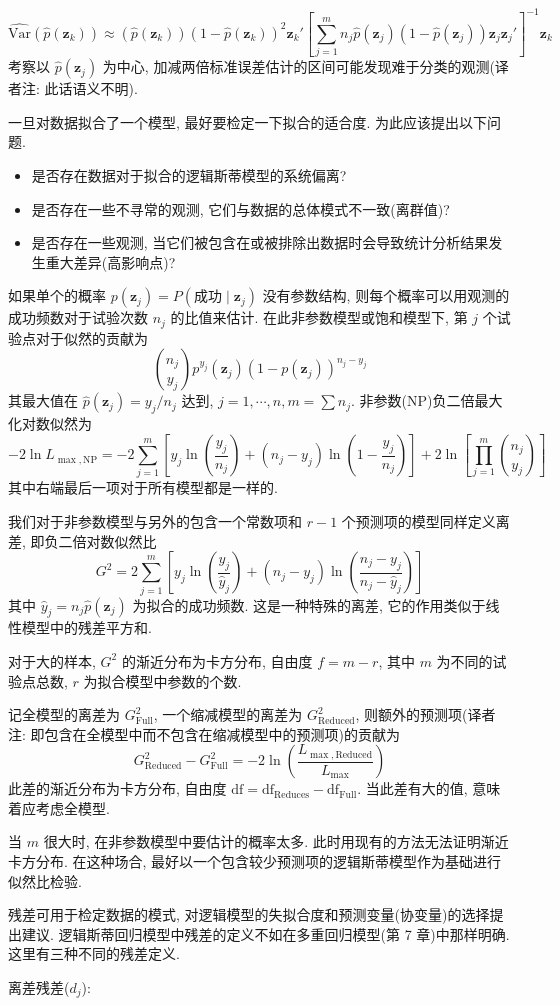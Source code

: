 
\[
\widehat{\mathrm{Var}}(\hat{p}(\mathbf{z}_k))\approx(\hat{p}(\mathbf{z}_k))(1-\hat{p}(\mathbf{z}_k))^2\mathbf{z}_k'\left[\sum_{j=1}^{m}n_j\hat{p}(\mathbf{z}_j)(1-\hat{p}(\mathbf{z}_j))\mathbf{z}_j\mathbf{z}_j'\right]^{-1}\mathbf{z}_k
\]
考察以 $\hat{p}(\mathbf{z}_j)$ 为中心, 加减两倍标准误差估计的区间可能发现难于分类的观测(译者注: 此话语义不明).

\quad{}\quad 一旦对数据拟合了一个模型, 最好要检定一下拟合的适合度. 为此应该提出以下问题.
\begin{itemize}
\item 是否存在数据对于拟合的逻辑斯蒂模型的系统偏离?
\item 是否存在一些不寻常的观测, 它们与数据的总体模式不一致(离群值)?
\item 是否存在一些观测, 当它们被包含在或被排除出数据时会导致统计分析结果发生重大差异(高影响点)?
\end{itemize}
如果单个的概率 $p(\mathbf{z}_j)=P(\text{成功}\mid \mathbf{z}_j)$ 没有参数结构, 则每个概率可以用观测的成功频数对于试验次数 $n_j$ 的比值来估计. 在此非参数模型或饱和模型下, 第 $j$ 个试验点对于似然的贡献为
\[
\binom{n_j}{y_j}p^{y_j}(\mathbf{z}_j)(1-p(\mathbf{z}_j))^{n_j-y_j}
\]
其最大值在 $\hat{p}(\mathbf{z}_j)=y_j/n_j$ 达到, $j=1,\cdots,n, m=\sum n_j$. 非参数(NP)负二倍最大化对数似然为
\label{eq:11-80}
\begin{equation}
-2\ln L_{\max,\mathrm{NP}}=-2\sum_{j=1}^{m}\left[y_j\ln\left(\frac{y_j}{n_j}\right)+(n_j-y_j)\ln\left(1-\frac{y_j}{n_j}\right)\right]+2\ln\left[\prod_{j=1}^{m}\binom{n_j}{y_j}\right]
\tag{11-80}
\end{equation}
其中右端最后一项对于所有模型都是一样的.

我们对于非参数模型与另外的包含一个常数项和 $r-1$ 个预测项的模型同样定义离差, 即负二倍对数似然比
\label{eq:11-81}
\begin{equation}
G^2=2\sum_{j=1}^{m}\left[y_j\ln\left(\frac{y_j}{\hat{y}_j}\right)+(n_j-y_j)\ln\left(\frac{n_j-y_j}{n_j-\hat{y}_j}\right)\right]
\tag{11-81}
\end{equation}
其中 $\hat{y}_j=n_j\hat{p}(\mathbf{z}_j)$ 为拟合的成功频数. 这是一种特殊的离差, 它的作用类似于线性模型中的残差平方和.

对于大的样本, $G^2$ 的渐近分布为卡方分布, 自由度 $f=m-r$, 其中 $m$ 为不同的试验点总数, $r$ 为拟合模型中参数的个数.

记全模型的离差为 $G^2_{\mathrm{Full}}$, 一个缩减模型的离差为 $G^2_{\mathrm{Reduced}}$, 则额外的预测项(译者注: 即包含在全模型中而不包含在缩减模型中的预测项)的贡献为
\label{eq:11-82}
\begin{equation}
G^2_{\mathrm{Reduced}}-G^2_{\mathrm{Full}}=-2\ln\left(\frac{L_{\max,\mathrm{Reduced}}}{L_{\max}}\right)
\tag{11-82}
\end{equation}
此差的渐近分布为卡方分布, 自由度 $\mathrm{df}=\mathrm{df}_{\mathrm{Reduces}}-\mathrm{df}_{\mathrm{Full}}$. 当此差有大的值, 意味着应考虑全模型.

当 $m$ 很大时, 在非参数模型中要估计的概率太多. 此时用现有的方法无法证明渐近卡方分布. 在这种场合, 最好以一个包含较少预测项的逻辑斯蒂模型作为基础进行似然比检验.

\quad{}\quad 残差可用于检定数据的模式, 对逻辑模型的失拟合度和预测变量(协变量)的选择提出建议. 逻辑斯蒂回归模型中残差的定义不如在多重回归模型(第 7 章)中那样明确. 这里有三种不同的残差定义.

\qquad 离差残差($d_j$):
